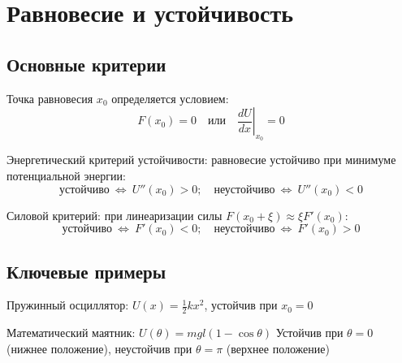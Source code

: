 \documentclass{article}
\begin{document}
\section*{Равновесие и устойчивость}

\subsection*{Основные критерии}
Точка равновесия $x_0$ определяется условием:
\[F(x_0)=0 \quad \text{или} \quad \left.\frac{dU}{dx}\right|_{x_0}=0\]

Энергетический критерий устойчивости: равновесие устойчиво при минимуме потенциальной энергии:
\[
\text{устойчиво}\ \Leftrightarrow\ U''(x_0)>0; \quad
\text{неустойчиво}\ \Leftrightarrow\ U''(x_0)<0
\]

Силовой критерий: при линеаризации силы $F(x_0+\xi)\approx \xi F'(x_0)$:
\[
\text{устойчиво}\ \Leftrightarrow\ F'(x_0)<0; \quad
\text{неустойчиво}\ \Leftrightarrow\ F'(x_0)>0
\]

\subsection*{Ключевые примеры}
Пружинный осциллятор: $U(x)=\frac12 kx^2$, устойчив при $x_0=0$

Математический маятник: $U(\theta)=mgl(1-\cos\theta)$
Устойчив при $\theta=0$ (нижнее положение), неустойчив при $\theta=\pi$ (верхнее положение)
\end{document}
